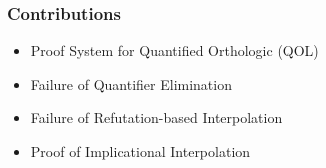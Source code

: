\documentclass[
    aspectratio=169,
    xcolor={dvipsnames},
]{beamer}
\begin{document}
\begin{frame}
    \frametitle{Contributions}




    \begin{itemize}
        \item Proof System for Quantified Orthologic (QOL)
        \item Failure of Quantifier Elimination
        \item Failure of Refutation-based Interpolation
        \item Proof of Implicational Interpolation
    \end{itemize}

\end{frame}
\end{document}

